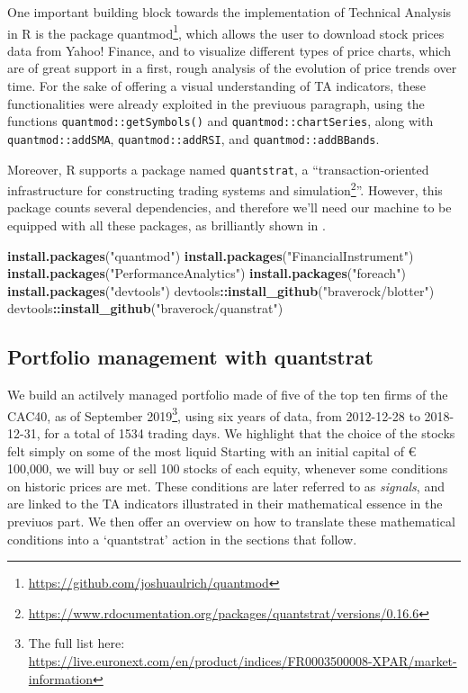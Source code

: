 \documentclass[
  11pt,
]{article}
\newenvironment{Shaded}{\begin{snugshade}}{\end{snugshade}}
\newcommand{\KeywordTok}[1]{\textcolor[rgb]{0.13,0.29,0.53}{\textbf{#1}}}
\newcommand{\NormalTok}[1]{#1}
\newcommand{\OperatorTok}[1]{\textcolor[rgb]{0.81,0.36,0.00}{\textbf{#1}}}
\newcommand{\StringTok}[1]{\textcolor[rgb]{0.31,0.60,0.02}{#1}}
\begin{document}
One important building block towards the implementation of Technical
Analysis in R is the package quantmod\footnote{\url{https://github.com/joshuaulrich/quantmod}},
which allows the user to download stock prices data from Yahoo! Finance,
and to visualize different types of price charts, which are of great
support in a first, rough analysis of the evolution of price trends over
time. For the sake of offering a visual understanding of TA indicators,
these functionalities were already exploited in the previuous paragraph,
using the functions \texttt{quantmod::getSymbols()} and
\texttt{quantmod::chartSeries}, along with \texttt{quantmod::addSMA},
\texttt{quantmod::addRSI}, and \texttt{quantmod::addBBands}.

Moreover, R supports a package named \texttt{quantstrat}, a
``transaction-oriented infrastructure for constructing trading systems
and simulation\footnote{\url{https://www.rdocumentation.org/packages/quantstrat/versions/0.16.6}}''.
However, this package counts several dependencies, and therefore we'll
need our machine to be equipped with all these packages, as brilliantly
shown in \citet{Yu2019}.

\begin{Shaded}
\begin{Highlighting}[]
\KeywordTok{install.packages}\NormalTok{(}\StringTok{"quantmod"}\NormalTok{)}
\KeywordTok{install.packages}\NormalTok{(}\StringTok{"FinancialInstrument"}\NormalTok{)}
\KeywordTok{install.packages}\NormalTok{(}\StringTok{"PerformanceAnalytics"}\NormalTok{)}
\KeywordTok{install.packages}\NormalTok{(}\StringTok{"foreach"}\NormalTok{)}
\KeywordTok{install.packages}\NormalTok{(}\StringTok{"devtools"}\NormalTok{)}
\NormalTok{devtools}\OperatorTok{::}\KeywordTok{install_github}\NormalTok{(}\StringTok{"braverock/blotter"}\NormalTok{)}
\NormalTok{devtools}\OperatorTok{::}\KeywordTok{install_github}\NormalTok{(}\StringTok{"braverock/quanstrat"}\NormalTok{)}
\end{Highlighting}
\end{Shaded}

\hypertarget{portfolio-management-with-quantstrat}{%
\subsection{Portfolio management with
quantstrat}\label{portfolio-management-with-quantstrat}}

We build an actilvely managed portfolio made of five of the top ten
firms of the CAC40, as of September 2019\footnote{The full list here:
  \url{https://live.euronext.com/en/product/indices/FR0003500008-XPAR/market-information}},
using six years of data, from 2012-12-28 to 2018-12-31, for a total of
1534 trading days. We highlight that the choice of the stocks felt
simply on some of the most liquid Starting with an initial capital of €
100,000, we will buy or sell 100 stocks of each equity, whenever some
conditions on historic prices are met. These conditions are later
referred to as \emph{signals}, and are linked to the TA indicators
illustrated in their mathematical essence in the previuos part. We then
offer an overview on how to translate these mathematical conditions into
a `quantstrat' action in the sections that follow.
\end{document}

